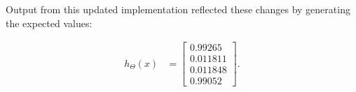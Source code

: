 \documentclass[titlepage]{scrartcl}
\begin{document}
Output from this updated implementation reflected these changes by generating
the expected values:

\begin{align}
h_\Theta(x) &= \begin{bmatrix}
            0.99265 \\
            0.011811 \\
            0.011848 \\
            0.99052
         \end{bmatrix}.
\end{align}

\end{document}
